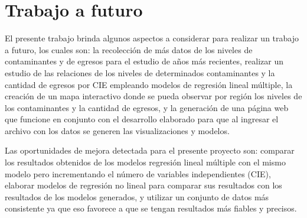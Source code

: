 \clearpage
\section{Trabajo a futuro}
El presente trabajo brinda algunos aspectos a considerar para realizar un trabajo a futuro, los cuales son: la recolección de más datos de los niveles de contaminantes y de egresos para el estudio de años más recientes, realizar un estudio de las relaciones de los niveles de determinados contaminantes y la cantidad de egresos por CIE empleando modelos de regresión lineal múltiple, la creación de un mapa interactivo donde se pueda observar por región los niveles de los contaminantes y la cantidad de egresos, y la generación de una página web que funcione en conjunto con el desarrollo elaborado para que al ingresar el archivo con los datos se generen las visualizaciones y modelos.

Las oportunidades de mejora detectada para el presente proyecto son: comparar los resultados obtenidos de los modelos regresión lineal múltiple con el mismo modelo pero incrementando el número de variables independientes (CIE), elaborar modelos de regresión no lineal para comparar sus resultados con los resultados de los modelos generados, y utilizar un conjunto de datos más consistente ya que eso favorece a que se tengan resultados más fiables y precisos.


